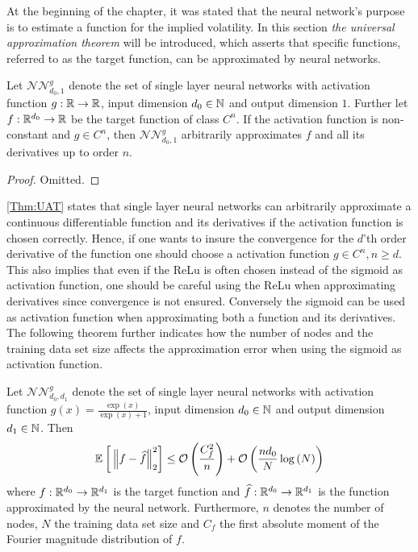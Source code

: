 At the beginning of the chapter, it was stated that the neural network's purpose is to estimate a function for the implied volatility. In this section \emph{the universal approximation theorem} will be introduced, which asserts that specific functions, referred to as the target function, can be approximated by neural networks.
\begin{thm} \label{Thm:UAT}
    Let $\mathcal{NN}_{d_0, 1}^g$ denote the set of single layer neural networks with activation function $g: \mathbb{R} \to \mathbb{R}$, input dimension $d_0 \in \mathbb{N}$ and output dimension $1$. Further let $f: \mathbb{R}^{d_0} \to \mathbb{R}$ be the target function of class $C^n$. If the activation function is non-constant and $g \in C^n$, then $\mathcal{NN}_{d_0, 1}^g$ arbitrarily approximates $f$ and all its derivatives up to order $n$.
\end{thm} 
\begin{proof}
    Omitted.
\end{proof}

\autoref{Thm:UAT} states that single layer neural networks can arbitrarily approximate a continuous differentiable function and its derivatives if the activation function is chosen correctly. Hence, if one wants to insure the convergence for the $d$'th order derivative of the function one should choose a activation function $g \in C^n, n \geq d$. This also implies that even if the ReLu is often chosen instead of the sigmoid as activation function, one should be careful using the ReLu when approximating derivatives since convergence is not ensured. Conversely the sigmoid can be used as activation function when approximating both a function and its derivatives. The following theorem further indicates how the number of nodes and the training data set size affects the approximation error when using the sigmoid as activation function.
\begin{thm}\label{Thm:estimation_bounds}
    Let $\mathcal{NN}_{d_0, d_1}^g$ denote the set of single layer neural networks with activation function $g(x) = \frac{\exp{(x)}}{\exp{(x)}+1}$, input dimension $d_0 \in \mathbb{N}$ and output dimension $d_1 \in \mathbb{N}$. Then
    \begin{align}\label{Eq:Estimation_bounds}
        \E{\norm{f-\hat{f}}_2^2} \leq \mathcal{O}\left(\frac{C_f^2}{n} \right) + \mathcal{O}\left(\frac{nd_0}{N} \log{(N)} \right) 
    \end{align}
    where $f: \mathbb{R}^{d_0} \to \mathbb{R}^{d_1}$ is the target function and $\widehat{f}: \mathbb{R}^{d_0} \to \mathbb{R}^{d_1}$ is the function approximated by the neural network. Furthermore, $n$ denotes the number of nodes, $N$ the training data set size and $C_f$ the first absolute moment of the Fourier magnitude distribution of $f$.
\end{thm}

